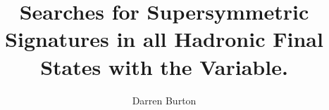 \documentclass{mythesis}
\title{\LARGE{Searches for Supersymmetric Signatures in all Hadronic Final States with the \alphat Variable.}}
\author{Darren Burton \vspace*{0.5cm}}
\begin{document}
\runninglinenumbers

\begin{frontmatter}
  
\end{frontmatter}

\begin{mainmatter}
  
  
  
  
  
  
  
\end{mainmatter}

\begin{appendices}
  
\end{appendices}

\begin{backmatter}
  
\end{backmatter}

\end{document}
